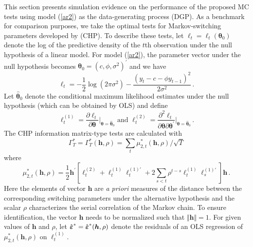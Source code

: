\documentclass[11pt]{article}
\begin{document}
This section presents simulation evidence on the performance of the proposed
MC tests using model (\ref{ar2}) as the data-generating process (DGP). As a
benchmark for comparison purposes, we take the optimal tests for
Markov-switching parameters developed by \citet{Carrasco-Hu-Ploberger:2014}
(CHP). To describe these tests, let $\ell _{t}=\ell _{t}(\boldsymbol{\theta }%
_{0})$ denote the log of the predictive density of the $t$th observation
under the null hypothesis of a linear model. For model (\ref{ar2}), the
parameter vector under the null hypothesis becomes $\boldsymbol{\theta }%
_{0}=(c,\phi ,\sigma ^{2})^{\prime }$ and we have 
\begin{equation*}
\ell _{t}=-\frac{1}{2}\log (2\pi \sigma ^{2})-\frac{(y_{t}-c-\phi
y_{t-1})^{2}}{2\sigma ^{2}}\,.
\end{equation*}%
Let $\hat{\boldsymbol{\theta }}_{0}$ denote the conditional maximum
likelihood estimates under the null hypothesis (which can be obtained by
OLS) and define 
\begin{equation*}
\ell _{t}^{(1)}=\frac{\partial \ell _{t}}{\partial \boldsymbol{\theta }}%
\Big\lvert_{\boldsymbol{\theta }=\hat{\boldsymbol{\theta }}_{0}}\mbox{ and }%
\ell _{t}^{(2)}=\frac{\partial ^{2}\ell _{t}}{\partial \boldsymbol{\theta }%
\partial \boldsymbol{\theta }^{\prime }}\Big\lvert_{\boldsymbol{\theta }=%
\hat{\boldsymbol{\theta }}_{0}}\,.
\end{equation*}%
The CHP information matrix-type tests are calculated with 
\begin{equation*}
\Gamma _{T}^{\ast }=\Gamma _{T}^{\ast }(\boldsymbol{h},\rho )=\sum_{t}\mu
_{2,t}^{\ast }(\boldsymbol{h},\rho )/\sqrt{T}
\end{equation*}%
where 
\begin{equation*}
\mu _{2,t}^{\ast }(\boldsymbol{h},\rho )=\frac{1}{2}\boldsymbol{h}^{\prime }%
\left[ \ell _{t}^{(2)}+\ell _{t}^{(1)}\ell _{t}^{(1)\prime }+2\sum_{s<t}\rho
^{t-s}\ell _{t}^{(1)}\ell _{s}^{(1)\prime }\right] \boldsymbol{h}\,.
\end{equation*}%
Here the elements of vector $\boldsymbol{h}$ are \emph{a priori} measures of
the distance between the corresponding switching parameters under the
alternative hypothesis and the scalar $\rho $ characterizes the serial
correlation of the Markov chain. To ensure identification, the vector $%
\boldsymbol{h}$ needs to be normalized such that $\Vert \boldsymbol{h}\Vert
=1.$ For given values of $\boldsymbol{h}$ and $\rho $, let $\hat{\boldsymbol{%
\varepsilon }}^{\ast }=\hat{\boldsymbol{\varepsilon }}^{\ast }(\boldsymbol{h}%
,\rho )$ denote the residuals of an OLS regression of $\mu _{2,t}^{\ast }(%
\boldsymbol{h},\rho )$ on $\ell _{t}^{(1)}$.
\end{document}
